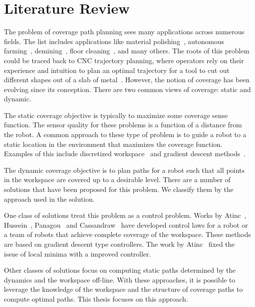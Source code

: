 \documentclass[../main.tex]{subfiles}
\begin{document}
\chapter{Literature Review}
\label{chapter:literature_review}

The problem of coverage path planning sees many applications across numerous fields. The list includes applications like material polishing~\cite{rososhansky2010coverage}, autonomous farming~\cite{ollis1997vision}, demining~\cite{acar2003path}, floor cleaning~\cite{yasutomi1988cleaning}, and many others. The roots of this problem could be traced back to CNC trajectory planning, where operators rely on their experience and intuition to plan an optimal trajectory for a tool to cut out different shapes out of a slab of metal~\cite{held1991computational}. However, the notion of coverage has been evolving since its conception. There are two common views of coverage: static and dynamic.

The static coverage objective is typically to maximize some coverage sense function. The sensor quality for these problems is a function of a distance from the robot. A common approach to these type of problem is to guide a robot to a static location in the environment that maximizes the coverage function. Examples of this include discretized  workspace~\cite{durham2012discrete} and gradient descent methods~\cite{cortes2002coverage}.

The dynamic coverage objective is to plan paths for a robot such that all points in the workspace are covered up to a desirable level. There are a number of solutions that have been proposed for this problem. We classify them by the approach used in the solution.

One class of solutions treat this problem as a control problem. Works by Atinc~\cite{atincc2013supervised}, Hussein~\cite{hussein2007effective}, Panagou~\cite{panagou2014vision} and Cassandraw~\cite{cassandras2013optimal} have developed control laws for a robot or a team of robots that achieve complete coverage of the workspace. These methods are based on gradient descent type controllers. The work by Atinc~\cite{atincc2013supervised} fixed the issue of local minima with a improved controller.

Other classes of solutions focus on computing static paths determined by the dynamics and the workspace off-line. With these approaches, it is possible to leverage the knowledge of the workspace and the structure of coverage paths to compute optimal paths. This thesis focuses on this approach.
\end{document}
